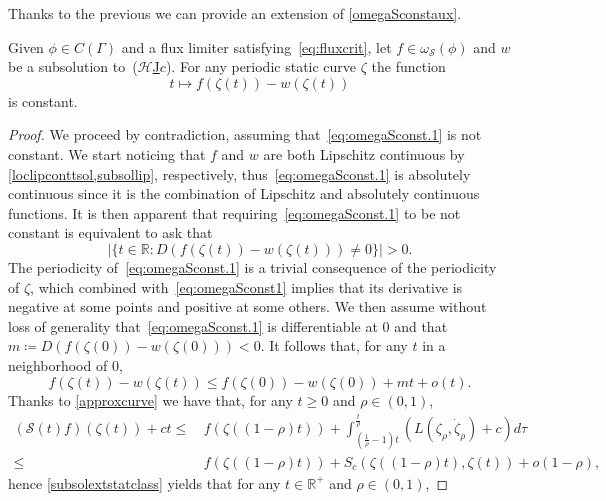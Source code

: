 \documentclass[11pt,a4paper,american]{article}
\newcommand{\Hcal}{\mathcal H}
\newcommand{\Rds}{\mathds R}
\newcommand{\Scal}{\mathcal S}
\newcommand{\hrefc}{\textup{(}\hyperref[eq:globeik]{\ensuremath{\Hcal}\textup{J}\ensuremath{c}}\textup{)}}
\begin{document}
    Thanks to the previous  we can provide an extension of \cref{omegaSconstaux}.

    \begin{lem}\label{omegaSconst}
        Given $\phi\in C(\Gamma)$ and a flux limiter satisfying~\cref{eq:fluxcrit}, let $f\in\omega_\Scal(\phi)$ and $w$ be a subsolution to~\hrefc{}. For any periodic static curve $\zeta$ the function
        \begin{equation}\label{eq:omegaSconst.1}
            t\longmapsto f(\zeta(t))-w(\zeta(t))
        \end{equation}
        is constant.
    \end{lem}
    \begin{proof}
        We proceed by contradiction, assuming that~\cref{eq:omegaSconst.1} is not constant. We start noticing that $f$ and $w$ are both Lipschitz continuous by \cref{loclipconttsol,subsollip}, respectively, thus~\cref{eq:omegaSconst.1} is absolutely continuous since it is the combination of Lipschitz and absolutely continuous functions. It is then apparent that requiring~\cref{eq:omegaSconst.1} to be not constant is equivalent to ask that
        \begin{equation}\label{eq:omegaSconst1}
            |\{t\in\Rds:D(f(\zeta(t))-w(\zeta(t)))\ne0\}|>0.
        \end{equation}
        The periodicity of~\cref{eq:omegaSconst.1} is a trivial consequence of the periodicity of $\zeta$, which combined with~\cref{eq:omegaSconst1} implies that its derivative is negative at some points and positive at some others. We then assume without loss of generality that~\cref{eq:omegaSconst.1} is differentiable at 0 and that $m\coloneqq D(f(\zeta(0))-w(\zeta(0)))<0$. It follows that, for any $t$ in a neighborhood of 0,
        \begin{equation}\label{eq:omegaSconst2}
            f(\zeta(t))-w(\zeta(t))\le f(\zeta(0))-w(\zeta(0))+mt+o(t).
        \end{equation}
        Thanks to \cref{approxcurve} we have that, for any $t\ge0$ and $\rho\in(0,1)$,
        \begin{align*}
            (\Scal(t)f)(\zeta(t))+ct\le&\,f(\zeta((1-\rho)t))+\int_{\left(\frac1\rho-1\right)t}^{\frac t\rho}\left(L\left(\zeta_\rho,\dot\zeta_\rho\right)+c\right)d\tau\\
            \le&\,f(\zeta((1-\rho)t))+S_c(\zeta((1-\rho)t),\zeta(t))+o(1-\rho),
        \end{align*}
        hence \cref{subsolextstatclass} yields that for any $t\in\Rds^+$ and $\rho\in(0,1)$,

\end{proof}
\end{document}
